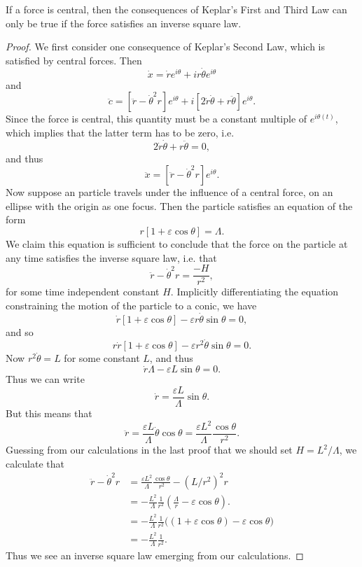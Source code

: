 \begin{theorem}
    If a force is central, then the consequences of Keplar's First and Third Law can only be true if the force satisfies an inverse square law.
\end{theorem}
\begin{proof}
    We first consider one consequence of Keplar's Second Law, which is satisfied by central forces. Then
    \[ \dot{x} = \dot{r} e^{i \theta} + i r \dot{\theta} e^{i \theta} \]
    and
    \[ \ddot{c} = \left[ \ddot{r} - \dot{\theta}^2 r \right] e^{i \theta} + i \left[ 2 \dot{r} \dot{\theta} + r \ddot{\theta} \right] e^{i \theta}. \]
    Since the force is central, this quantity must be a constant multiple of $e^{i\theta(t)}$, which implies that the latter term has to be zero, i.e.
    \[ 2 \dot{r} \dot{\theta} + r \ddot{\theta} = 0, \]
    and thus
    \[ \ddot{x} = \left[ \ddot{r} - \dot{\theta}^2 r \right] e^{i \theta}. \]
    Now suppose an particle travels under the influence of a central force, on an ellipse with the origin as one focus. Then the particle satisfies an equation of the form
    \[ r [1 + \varepsilon \cos \theta] = \Lambda. \]
    We claim this equation is sufficient to conclude that the force on the particle at any time satisfies the inverse square law, i.e. that
    \[ \ddot{r} - \dot{\theta}^2 r = \frac{-H}{r^2}, \]
    for some time independent constant $H$. Implicitly differentiating the equation constraining the motion of the particle to a conic, we have
    \[ \dot{r} [ 1 + \varepsilon \cos \theta ] - \varepsilon r \dot{\theta} \sin \theta = 0, \]
    and so
    \[ r \dot{r} [ 1 + \varepsilon \cos \theta] - \varepsilon r^2 \dot{\theta} \sin \theta = 0. \]
    Now $r^2 \dot{\theta} = L$ for some constant $L$, and thus
    \[ \dot{r} \Lambda - \varepsilon L \sin \theta = 0. \]
    Thus we can write
    \[ \dot{r} = \frac{\varepsilon L}{\Lambda} \sin \theta. \]
    But this means that
    \[ \ddot{r} = \frac{\varepsilon L}{\Lambda} \dot{\theta} \cos \theta = \frac{\varepsilon L^2}{\Lambda} \frac{\cos \theta}{r^2}. \]
    Guessing from our calculations in the last proof that we should set $H = L^2 / \Lambda$, we calculate that
    \begin{align*}
        \ddot{r} - \dot{\theta}^2 r &= \frac{\varepsilon L^2}{\Lambda} \frac{\cos \theta}{r^2} - ( L / r^2 )^2 r\\
        &= - \frac{L^2}{\Lambda} \frac{1}{r^2} \left( \frac{\Lambda}{r} - \varepsilon \cos \theta \right).\\
        &= - \frac{L^2}{\Lambda} \frac{1}{r^2} \Big( (1 + \varepsilon \cos \theta) - \varepsilon \cos \theta \Big)\\
        &= - \frac{L^2}{\Lambda} \frac{1}{r^2}.
    \end{align*}
    Thus we see an inverse square law emerging from our calculations.
\end{proof}

